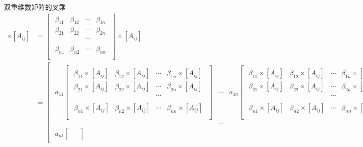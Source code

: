 \documentclass[twoside,a4paper,CCT]{cctart}   %
\begin{document}
\begin{define} 双重维数矩阵的叉乘
\begin{align*}
[B_{ijkl}] \times [A_{ij}]&=
   \begin{bmatrix}\begin{smallmatrix}
  \beta_{11}& \beta_{12}& \cdots&\beta_{1n}\\
  \beta_{21}& \beta_{22}& \cdots&\beta_{2n}\\
  & & \cdots&\\&\\
  \beta_{n1}& \beta_{n2}& \cdots&\beta_{nn}\\
 \end{smallmatrix}\end{bmatrix} \times [A_{ij}]\\
 &=
 \begin{bmatrix}\begin{smallmatrix}
 a_{11}\begin{bmatrix}\begin{smallmatrix}
  \beta_{11}\times [A_{ij}]& \beta_{12}\times [A_{ij}]& \cdots&\beta_{1n}\times [A_{ij}]\\
  \beta_{21}\times [A_{ij}]& \beta_{22}\times [A_{ij}]& \cdots&\beta_{2n}\times [A_{ij}]\\
  & & \cdots&\\&\\
  \beta_{n1}\times [A_{ij}]& \beta_{n2}\times [A_{ij}]& \cdots&\beta_{nn}\times [A_{ij}]\\
 \end{smallmatrix}\end{bmatrix}&
 \cdots&
 a_{1n}\begin{bmatrix}\begin{smallmatrix}
  \beta_{11}\times [A_{ij}]& \beta_{12}\times [A_{ij}]& \cdots&\beta_{1n}\times [A_{ij}]\\
  \beta_{21}\times [A_{ij}]& \beta_{22}\times [A_{ij}]& \cdots&\beta_{2n}\times [A_{ij}]\\
  & & \cdots&\\&\\
  \beta_{n1}\times [A_{ij}]& \beta_{n2}\times [A_{ij}]& \cdots&\beta_{nn}\times [A_{ij}]\\
 \end{smallmatrix}\end{bmatrix}\\
 & \cdots&&\\
 a_{n1}\begin{bmatrix}\begin{smallmatrix}

\end{smallmatrix}
\end{bmatrix}
\end{smallmatrix}
\end{bmatrix}
\end{align*}
\end{define}
\end{document}
